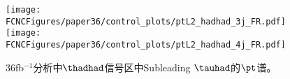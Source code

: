 
\begin{figure}[H]
\centering
\texttt{[image: \\FCNCFigures/paper36/control\_plots/ptL2\_hadhad\_3j\_FR.pdf]}
\texttt{[image: \\FCNCFigures/paper36/control\_plots/ptL2\_hadhad\_4j\_FR.pdf]}
\caption{36fb$^{-1}$分析中$\thadhad$信号区中Subleading $\tauhad$的$\pt$谱。}
\label{fig:Modelling36hh}
\end{figure}
